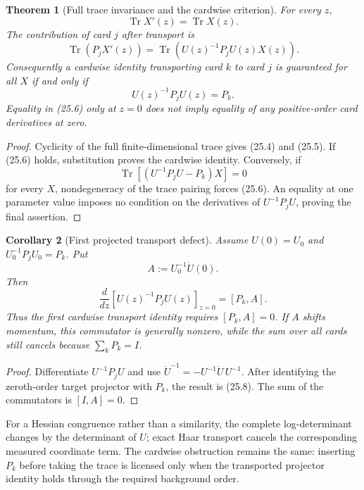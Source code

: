 \documentclass[11pt]{article}
\newtheorem{theorem}{Theorem}[section]
\newtheorem{corollary}[theorem]{Corollary}
\theoremstyle{remark}
\begin{document}
\begin{theorem}[Full trace invariance and the cardwise criterion]
\label{thm:v12v25-trace}
For every \(z\),
\[
                         \operatorname{Tr}X'(z)
 =\operatorname{Tr}X(z).                                   \tag{25.4}
\]
The contribution of card \(j\) after transport is
\[
 \operatorname{Tr}(P_jX'(z))
 =
 \operatorname{Tr}\!\left(
 U(z)^{-1}P_jU(z)X(z)
 \right).                                                   \tag{25.5}
\]
Consequently a cardwise identity transporting card \(k\) to card
\(j\) is guaranteed for all \(X\) if and only if
\[
                         U(z)^{-1}P_jU(z)=P_k.              \tag{25.6}
\]
Equality in (25.6) only at \(z=0\) does not imply equality of any
positive-order card derivatives at zero.
\end{theorem}

\begin{proof}
Cyclicity of the full finite-dimensional trace gives (25.4) and
(25.5).  If (25.6) holds, substitution proves the cardwise identity.
Conversely, if
\[
 \operatorname{Tr}\!\left[
 (U^{-1}P_jU-P_k)X
 \right]=0
\]
for every \(X\), nondegeneracy of the trace pairing forces (25.6).
An equality at one parameter value imposes no condition on the
derivatives of \(U^{-1}P_jU\), proving the final assertion.
\end{proof}

\begin{corollary}[First projected transport defect]
\label{cor:v12v25-first}
Assume \(U(0)=U_0\) and
\(U_0^{-1}P_jU_0=P_k\).  Put
\[
                         A:=U_0^{-1}\dot U(0).              \tag{25.7}
\]
Then
\[
 \frac{d}{dz}
 \left[U(z)^{-1}P_jU(z)\right]_{z=0}
 =
                         [P_k,A].                          \tag{25.8}
\]
Thus the first cardwise transport identity requires
\([P_k,A]=0\).  If \(A\) shifts momentum, this commutator is generally
nonzero, while the sum over all cards still cancels because
\(\sum_kP_k=I\).
\end{corollary}

\begin{proof}
Differentiate \(U^{-1}P_jU\) and use
\(\dot U^{-1}=-U^{-1}\dot U\,U^{-1}\).  After identifying the
zeroth-order target projector with \(P_k\), the result is (25.8).
The sum of the commutators is \([I,A]=0\).
\end{proof}

For a Hessian congruence rather than a similarity, the complete
log-determinant changes by the determinant of \(U\); exact Haar
transport cancels the corresponding measured coordinate term.
The cardwise obstruction remains the same: inserting \(P_k\) before
taking the trace is licensed only when the transported projector
identity holds through the required background order.
\end{document}
